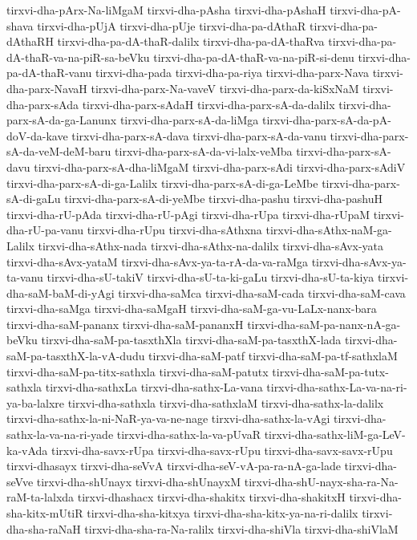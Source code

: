 {tirxvi-dha-pArx-Na-liMgaM
tirxvi-dha-pAsha
tirxvi-dha-pAshaH
tirxvi-dha-pA-shava
tirxvi-dha-pUjA
tirxvi-dha-pUje
tirxvi-dha-pa-dAthaR
tirxvi-dha-pa-dAthaRH
tirxvi-dha-pa-dA-thaR-dalilx
tirxvi-dha-pa-dA-thaRva
tirxvi-dha-pa-dA-thaR-va-na-piR-sa-beVku
tirxvi-dha-pa-dA-thaR-va-na-piR-si-denu
tirxvi-dha-pa-dA-thaR-vanu
tirxvi-dha-pada
tirxvi-dha-pa-riya
tirxvi-dha-parx-Nava
tirxvi-dha-parx-NavaH
tirxvi-dha-parx-Na-vaveV
tirxvi-dha-parx-da-kiSxNaM
tirxvi-dha-parx-sAda
tirxvi-dha-parx-sAdaH
tirxvi-dha-parx-sA-da-dalilx
tirxvi-dha-parx-sA-da-ga-Lanunx
tirxvi-dha-parx-sA-da-liMga
tirxvi-dha-parx-sA-da-pA-doV-da-kave
tirxvi-dha-parx-sA-dava
tirxvi-dha-parx-sA-da-vanu
tirxvi-dha-parx-sA-da-veM-deM-baru
tirxvi-dha-parx-sA-da-vi-lalx-veMba
tirxvi-dha-parx-sA-davu
tirxvi-dha-parx-sA-dha-liMgaM
tirxvi-dha-parx-sAdi
tirxvi-dha-parx-sAdiV
tirxvi-dha-parx-sA-di-ga-Lalilx
tirxvi-dha-parx-sA-di-ga-LeMbe
tirxvi-dha-parx-sA-di-gaLu
tirxvi-dha-parx-sA-di-yeMbe
tirxvi-dha-pashu
tirxvi-dha-pashuH
tirxvi-dha-rU-pAda
tirxvi-dha-rU-pAgi
tirxvi-dha-rUpa
tirxvi-dha-rUpaM
tirxvi-dha-rU-pa-vanu
tirxvi-dha-rUpu
tirxvi-dha-sAthxna
tirxvi-dha-sAthx-naM-ga-Lalilx
tirxvi-dha-sAthx-nada
tirxvi-dha-sAthx-na-dalilx
tirxvi-dha-sAvx-yata
tirxvi-dha-sAvx-yataM
tirxvi-dha-sAvx-ya-ta-rA-da-va-raMga
tirxvi-dha-sAvx-ya-ta-vanu
tirxvi-dha-sU-takiV
tirxvi-dha-sU-ta-ki-gaLu
tirxvi-dha-sU-ta-kiya
tirxvi-dha-saM-baM-di-yAgi
tirxvi-dha-saMca
tirxvi-dha-saM-cada
tirxvi-dha-saM-cava
tirxvi-dha-saMga
tirxvi-dha-saMgaH
tirxvi-dha-saM-ga-vu-LaLx-nanx-bara
tirxvi-dha-saM-pananx
tirxvi-dha-saM-pananxH
tirxvi-dha-saM-pa-nanx-nA-ga-beVku
tirxvi-dha-saM-pa-tasxthXla
tirxvi-dha-saM-pa-tasxthX-lada
tirxvi-dha-saM-pa-tasxthX-la-vA-dudu
tirxvi-dha-saM-patf
tirxvi-dha-saM-pa-tf-sathxlaM
tirxvi-dha-saM-pa-titx-sathxla
tirxvi-dha-saM-patutx
tirxvi-dha-saM-pa-tutx-sathxla
tirxvi-dha-sathxLa
tirxvi-dha-sathx-La-vana
tirxvi-dha-sathx-La-va-na-ri-ya-ba-lalxre
tirxvi-dha-sathxla
tirxvi-dha-sathxlaM
tirxvi-dha-sathx-la-dalilx
tirxvi-dha-sathx-la-ni-NaR-ya-va-ne-nage
tirxvi-dha-sathx-la-vAgi
tirxvi-dha-sathx-la-va-na-ri-yade
tirxvi-dha-sathx-la-va-pUvaR
tirxvi-dha-sathx-liM-ga-LeV-ka-vAda
tirxvi-dha-savx-rUpa
tirxvi-dha-savx-rUpu
tirxvi-dha-savx-savx-rUpu
tirxvi-dhasayx
tirxvi-dha-seVvA
tirxvi-dha-seV-vA-pa-ra-nA-ga-lade
tirxvi-dha-seVve
tirxvi-dha-shUnayx
tirxvi-dha-shUnayxM
tirxvi-dha-shU-nayx-sha-ra-Na-raM-ta-lalxda
tirxvi-dhashacx
tirxvi-dha-shakitx
tirxvi-dha-shakitxH
tirxvi-dha-sha-kitx-mUtiR
tirxvi-dha-sha-kitxya
tirxvi-dha-sha-kitx-ya-na-ri-dalilx
tirxvi-dha-sha-raNaH
tirxvi-dha-sha-ra-Na-ralilx
tirxvi-dha-shiVla
tirxvi-dha-shiVlaM
}
